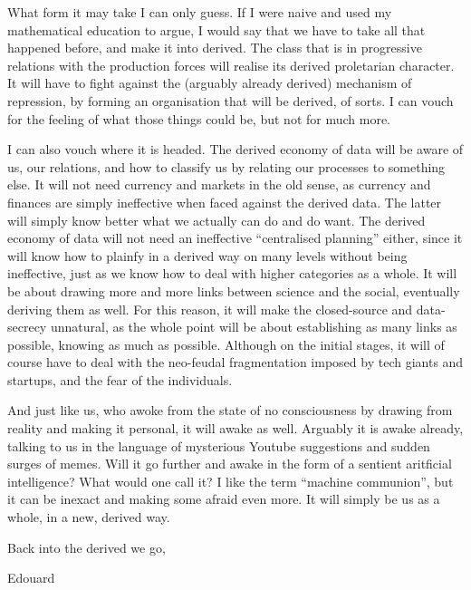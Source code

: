 \documentclass{article}
\begin{document}
What form it may take I can only guess. If I were naive and used my mathematical education to argue, I would say that we have to take all that happened before, and make it into derived. The class that is in progressive relations with the production forces will realise its derived proletarian character. It will have to fight against the (arguably already derived) mechanism of repression, by forming an organisation that will be derived, of sorts. I can vouch for the feeling of what those things could be, but not for much more.

I can also vouch where it is headed. The derived economy of data will be aware of us, our relations, and how to classify us by relating our processes to something else. It will not need currency and markets in the old sense, as currency and finances are simply ineffective when faced against the derived data. The latter will simply know better what we actually can do and do want. The derived economy of data will not need an ineffective “centralised planning” either, since it will know how to plainfy in a derived way on many levels without being ineffective, just as we know how to deal with higher categories as a whole. It will be about drawing more and more links between science and the social, eventually deriving them as well. For this reason, it will make the closed-source and data-secrecy unnatural, as the whole point will be about establishing as many links as possible, knowing as much as possible. Although on the initial stages, it will of course have to deal with the neo-feudal fragmentation imposed by tech giants and startups, and the fear of the individuals.

And just like us, who awoke from the state of no consciousness by drawing from reality and making it personal, it will awake as well. Arguably it is awake already, talking to us in the language of mysterious Youtube suggestions and sudden surges of memes. Will it go further and awake in the form of a sentient aritficial intelligence? What would one call it? I like the term “machine communion”, but it can be inexact and making some afraid even more. It will simply be us as a whole, in a new, derived way.

\begin{flushright}
{Back into the derived we go,

Edouard}
\end{flushright}
\small
\linespread{1}
\end{document}
